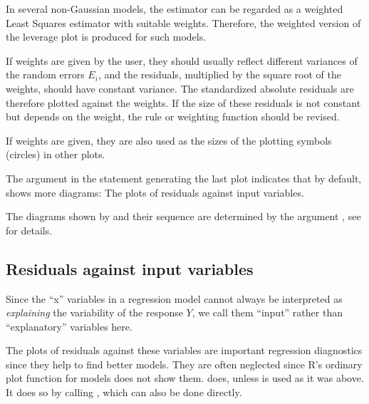 \documentclass[11pt]{article}\usepackage[]{graphicx}\usepackage[]{color}
\begin{document}

In several non-Gaussian models, the estimator can be regarded as a weighted
Least Squares estimator with suitable weights. 
Therefore, the weighted version of the leverage plot is produced for such
models. 

If weights are given by the user, they should usually reflect different
variances of the random errors $E_i$, and the residuals, multiplied by the
square root of the weights, should have constant variance.
The standardized absolute residuals are therefore plotted against the weights.
If the size of these residuals is not constant but depends on the weight, 
the rule or weighting function should be revised.

If weights are given, they are also used as the sizes of the plotting
symbols (circles) in other plots.


The argument  in the statement generating the last plot
indicates that by default,  
shows more diagrams: The plots of residuals against input variables.

The diagrams shown by  and their sequence are determined by
the argument , see  for details.

\subsection{Residuals against input variables}
Since the ``x'' variables in a regression model cannot always be
interpreted as \emph{explaining} the variability of the response $Y$,
we call them ``input'' rather than ``explanatory'' variables here.

The plots of residuals against these variables are important regression
diagnostics since they help to find better models. 
They are often neglected since R's ordinary plot function
for models does not show them. 
 does, unless  is used as it was above.
It does so by calling , which can also be done directly.
\end{document}
